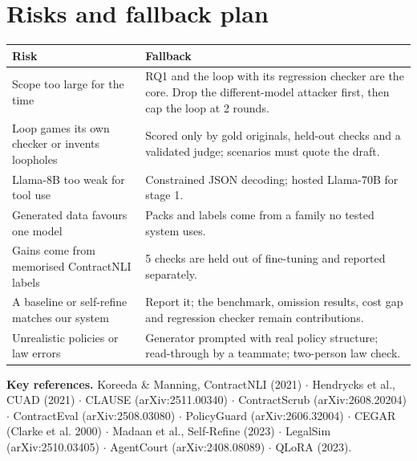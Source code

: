 \documentclass[11pt,a4paper]{article}
\begin{document}
\section{Risks and fallback plan}
{\footnotesize
\begin{xltabular}{\textwidth}{@{}LL@{}}
\toprule
\textbf{Risk} & \textbf{Fallback} \\
\midrule
Scope too large for the time & RQ1 and the loop with its regression checker are the core. Drop the different-model attacker first, then cap the loop at 2 rounds. \\
Loop games its own checker or invents loopholes & Scored only by gold originals, held-out checks and a validated judge; scenarios must quote the draft. \\
Llama-8B too weak for tool use & Constrained JSON decoding; hosted Llama-70B for stage 1. \\
Generated data favours one model & Packs and labels come from a family no tested system uses. \\
Gains come from memorised ContractNLI labels & 5 checks are held out of fine-tuning and reported separately. \\
A baseline or self-refine matches our system & Report it; the benchmark, omission results, cost gap and regression checker remain contributions. \\
Unrealistic policies or law errors & Generator prompted with real policy structure; read-through by a teammate; two-person law check. \\
\bottomrule
\end{xltabular}}

\vspace{-10pt}
{\scriptsize\textbf{Key references.} Koreeda \& Manning, ContractNLI (2021) $\cdot$ Hendrycks et al., CUAD (2021) $\cdot$ CLAUSE (arXiv:2511.00340) $\cdot$ ContractScrub (arXiv:2608.20204) $\cdot$ ContractEval (arXiv:2508.03080) $\cdot$ PolicyGuard (arXiv:2606.32004) $\cdot$ CEGAR (Clarke et al. 2000) $\cdot$ Madaan et al., Self-Refine (2023) $\cdot$ LegalSim (arXiv:2510.03405) $\cdot$ AgentCourt (arXiv:2408.08089) $\cdot$ QLoRA (2023).}
\end{document}

